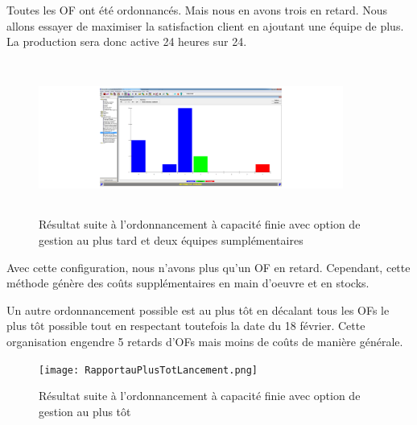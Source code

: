 \documentclass{scrreprt}
\begin{document}
Toutes les OF ont été ordonnancés. Mais nous en avons trois en retard. Nous allons essayer de maximiser la satisfaction client en ajoutant une équipe de plus. La production sera donc active 24 heures sur 24.

\begin{figure}[!h]
\centering
\includegraphics[width=10cm, height=5cm]{2equipeenplus.png}
\caption{Résultat suite à l'ordonnancement à capacité finie avec option de gestion au plus tard et deux équipes sumplémentaires}
\end{figure}

Avec cette configuration, nous n'avons plus qu'un OF en retard. Cependant, cette méthode génère des coûts supplémentaires en main d'oeuvre et en stocks.

Un autre ordonnancement possible est au plus tôt en décalant tous les OFs le plus tôt possible tout en respectant toutefois la date du 18 février. Cette organisation engendre 5 retards d'OFs mais moins de coûts de manière générale.

 \begin{figure}[!h]
\centering
\texttt{[image: RapportauPlusTotLancement.png]}
\caption{Résultat suite à l'ordonnancement à capacité finie avec option de gestion au plus tôt}
\end{figure}
\end{document}
